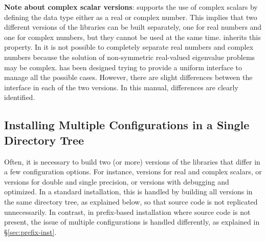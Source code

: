 \medskip
\textbf{Note about complex scalar versions}: \petsc supports the use of complex scalars by defining the data type  either as a real or complex number. This implies that two different versions of the \petsc libraries can be built separately, one for real numbers and one for complex numbers, but they cannot be used at the same time. \slepc inherits this property. In \slepc it is not possible to completely separate real numbers and complex numbers because the solution of non-symmetric real-valued eigenvalue problems may be complex. \slepc has been designed trying to provide a uniform interface to manage all the possible cases. However, there are slight differences between the interface in each of the two versions. In this manual, differences are clearly identified.

\subsection{Installing Multiple Configurations in a Single Directory Tree}
\label{sec:mult-inst}

Often, it is necessary to build two (or more) versions of the libraries that differ in a few configuration options. For instance, versions for real and complex scalars, or versions for double and single precision, or versions with debugging and optimized. In a standard installation, this is handled by building all versions in the same directory tree, as explained below, so that source code is not replicated unnecessarily. In contrast, in prefix-based installation where source code is not present, the issue of multiple configurations is handled differently, as explained in \S\ref{sec:prefix-inst}.


